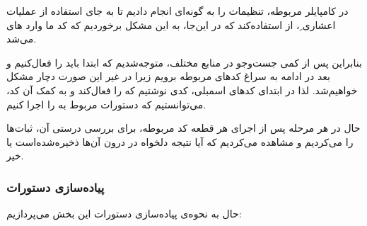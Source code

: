 در کامپایلر مربوطه، تنظیمات را به گونه‌ای انجام دادیم تا به جای استفاده از عملیات اعشاری
ِ،
 از
  استفاده‌کند که در این‌جا، به این مشکل برخوردیم که کد ما وارد 
های
 می‌شد.

بنابراین پس از کمی جست‌وجو در منابع مختلف، متوجه‌شدیم که ابتدا باید
 را فعال‌کنیم و بعد در ادامه به سراغ کدهای مربوطه برویم زیرا در غیر این صورت دچار مشکل خواهیم‌شد. لذا در ابتدای کدهای اسمبلی، کدی نوشتیم که
  را فعال‌کند و به کمک آن کد، می‌توانستیم که دستورات مربوط به
 را اجرا کنیم.
  
  حال در هر مرحله پس از اجرای هر قطعه کد مربوطه، برای بررسی درستی آن، ثبات‌ها را
   می‌کردیم و مشاهده می‌کردیم که آیا نتیجه دلخواه در درون آن‌ها ذخیره‌شده‌است یا خیر.
  

\subsubsection*{پیاده‌سازی دستورات}
حال به نحوه‌ی پیاده‌سازی دستورات این بخش می‌پردازیم:

